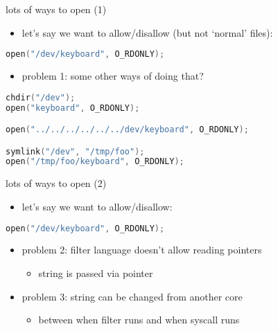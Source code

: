 
\begin{frame}[fragile,label=openRuleP1]{lots of ways to open (1)}
\begin{itemize}
\item let's say we want to allow/disallow (but not `normal' files):
\end{itemize}
\begin{lstlisting}[language=C,style=smaller]
open("/dev/keyboard", O_RDONLY);
\end{lstlisting}
\begin{itemize}
\item problem 1: some other ways of doing that?
\end{itemize}
\begin{lstlisting}[language=C,style=smaller]
chdir("/dev");
open("keyboard", O_RDONLY);

open("../../../../../../dev/keyboard", O_RDONLY);

symlink("/dev", "/tmp/foo");
open("/tmp/foo/keyboard", O_RDONLY);
\end{lstlisting}
\end{frame}

\begin{frame}[fragile,label=openRuleP2]{lots of ways to open (2)}
\begin{itemize}
\item let's say we want to allow/disallow:
\end{itemize}
\begin{lstlisting}[language=C,style=smaller]
open("/dev/keyboard", O_RDONLY);
\end{lstlisting}
\begin{itemize}
\item problem 2: filter language doesn't allow reading pointers
    \begin{itemize}
    \item string is passed via pointer
    \end{itemize}
\item problem 3: string can be changed from another core
    \begin{itemize}
    \item between when filter runs and when syscall runs
    \end{itemize}
\end{itemize}
\end{frame}

